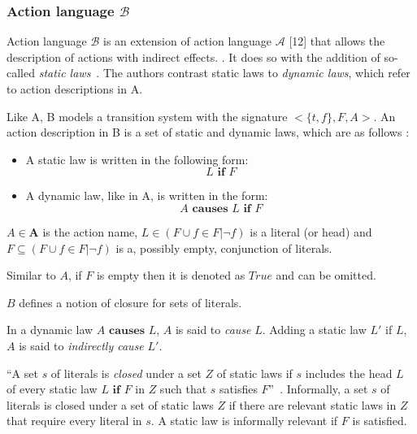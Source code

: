 \subsubsection{Action language $ \mathcal{B} $}
\label{subsubsec:action_language_b}

Action language $ \mathcal{B} $ is an extension of action language $ \mathcal{A} $ [12] that allows the description of actions with indirect effects.
\cite{gelfond_action_1998}.
It does so with the addition of so-called \textit{static laws}~\cite{gelfond_action_1998}.
The authors contrast static laws to \textit{dynamic laws}, which refer to action descriptions in A.

Like A, B models a transition system with the signature $<\{t, f\},F,A>$.
An action description in B is a set of static and dynamic laws, which are as follows \cite{gelfond_action_1998}:

\begin{itemize}
    \item A static law is written in the following form:
        $$
        L \textbf{ if } F
        $$

    \item A dynamic law, like in A, is written in the form:
        $$
        A \textbf{ causes } L \textbf{ if } F
        $$
\end{itemize}

$A \in \boldsymbol{A}$ is the action name, $L \in(F \cup{f \in F| \neg f})$ is a literal (or head) and $F \subseteq(F \cup{f \in F| \neg f})$ is a, possibly empty, conjunction of literals.

Similar to $A$, if $F$ is empty then it is denoted as $True$ and can be omitted.

$B$ defines a notion of closure for sets of literals.

\begin{definition}
    In a dynamic law $A \textbf{ causes } L$, $A$ is said to \textit{cause} $L$.
    Adding a static law $L'$ if $L$, $A$ is said to \textit{indirectly cause} $L'$.
\end{definition}

\begin{definition}
    ``A set $s$ of literals is \textit{closed} under a set $Z$ of static laws if $s$ includes the head $L$ of every static law $L \textbf{ if } F$ in $Z$ such that $s$ satisfies $F$''~\cite{gelfond_action_1998}.
    Informally, a set $s$ of literals is closed under a set of static laws $Z$ if there are relevant static laws in $Z$ that require every literal in $s$.
    A static law is informally relevant if $F$ is satisfied.
\end{definition}


